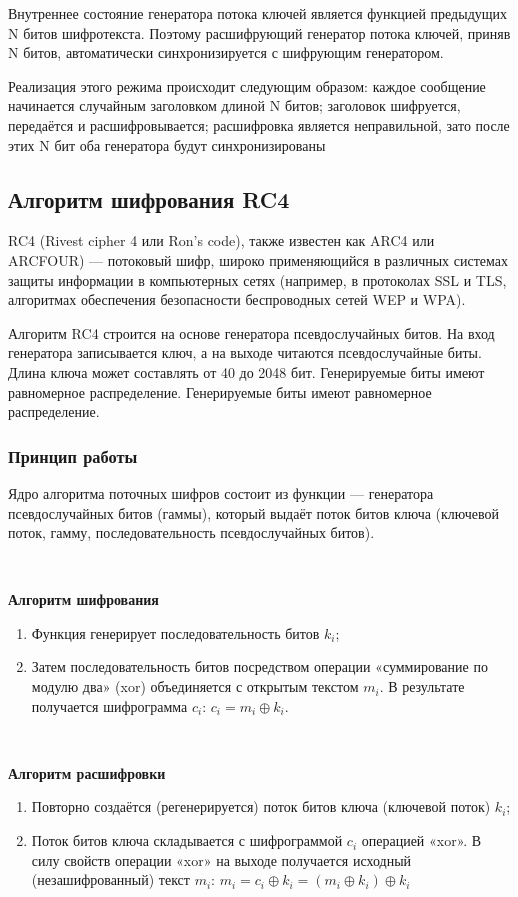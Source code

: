 \documentclass[a4paper]{report}
\begin{document}
Внутреннее состояние генератора потока ключей является функцией предыдущих N битов шифротекста. Поэтому расшифрующий генератор потока ключей, приняв N битов, автоматически синхронизируется с шифрующим генератором.

Реализация этого режима происходит следующим образом: каждое сообщение начинается случайным заголовком длиной N битов; заголовок шифруется, передаётся и расшифровывается; расшифровка является неправильной, зато после этих N бит оба генератора будут синхронизированы


\subsection{Алгоритм шифрования RC4}

RC4 (Rivest cipher 4 или Ron’s code), также известен как ARC4 или ARCFOUR) — потоковый шифр, широко применяющийся в различных системах защиты информации в компьютерных сетях (например, в протоколах SSL и TLS, алгоритмах обеспечения безопасности беспроводных сетей WEP и WPA).

Алгоритм RC4 строится на основе генератора псевдослучайных битов. На вход генератора записывается ключ, а на выходе читаются псевдослучайные биты. Длина ключа может составлять от 40 до 2048 бит. Генерируемые биты имеют равномерное распределение. Генерируемые биты имеют равномерное распределение.

\subsubsection{Принцип работы} 
Ядро алгоритма поточных шифров состоит из функции — генератора псевдослучайных битов (гаммы), который выдаёт поток битов ключа (ключевой поток, гамму, последовательность псевдослучайных битов).

~

\textbf{Алгоритм шифрования}
\begin{enumerate}
\item Функция генерирует последовательность битов $k_{i}$;
\item Затем последовательность битов посредством операции «суммирование по модулю два» (xor) объединяется с открытым текстом $m_{i}$. В результате получается шифрограмма $c_{i}$: $c_{i}=m_{i}\oplus k_{i}$.
\end{enumerate}

~

\textbf{Алгоритм расшифровки}
\begin{enumerate}
\item Повторно создаётся (регенерируется) поток битов ключа (ключевой поток) $k_{i}$;
\item Поток битов ключа складывается с шифрограммой $c_{i}$ операцией «xor». В силу свойств операции «xor» на выходе получается исходный (незашифрованный) текст $m_{i}$:
$m_{i}=c_{i}\oplus k_{i}=(m_{i}\oplus k_{i})\oplus k_{i}$
\end{enumerate}
\end{document}
